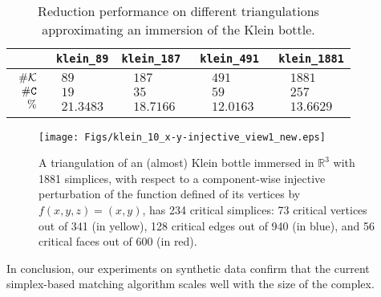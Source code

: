 \documentclass[12pt]{article}
\newcommand{\R}{{\mathbb R}}
\newcommand{\cK}{{\cal K}}
\newcommand{\sC}{\texttt{C}} \newcommand{\sD}{\texttt{D}} \newcommand{\sM}{\texttt{M}} \newcommand{\sL}{\texttt{L}}
\begin{document}
\begin{table}[h]
\caption{Reduction performance on different triangulations approximating an immersion of the Klein bottle.}
\begin{center}
\begin{tabular}{| c | c | c | c| c |}
\hline
 & \tt{klein\_89}&
 \tt{klein\_187} & \tt{klein\_491} &  \tt{klein\_1881}\\
 \hline
  $\begin{array}{rrr}\# \cK\\ \# \sC\\ \% \end{array}$ &
 $\begin{array}{rrr}  89 \\19 \\21.3483 \end{array}$ &
$\begin{array}{rrr}   187\\ 35 \\   18.7166 \end{array}$ &
$\begin{array}{rrr}   491\\ 59\\    12.0163   \end{array}$ &
$\begin{array}{rrr}   1881\\ 257 \\   13.6629   \end{array}$
\\
 \hline
 \end{tabular}
 \end{center}
\label{tab:klein}
\end{table}


\begin{figure}
\begin{center}
\texttt{[image: Figs/klein\_10\_x-y-injective\_view1\_new.eps]}
  \caption{A triangulation of an (almost) Klein bottle immersed in $\R^3$ with 1881 simplices, with respect to a component-wise injective perturbation of the function defined of its vertices by $f(x,y,z)=(x,y)$, has 234 critical simplices: 73 critical vertices  out of 341  (in yellow), 128 critical edges  out of 940 (in blue),  and 56 critical faces  out of 600 (in red).
 }
\end{center}
\label{fig:klein}
\end{figure}


In conclusion, our experiments on synthetic data confirm that the current simplex-based matching algorithm scales well with the size of the complex.
\end{document}
